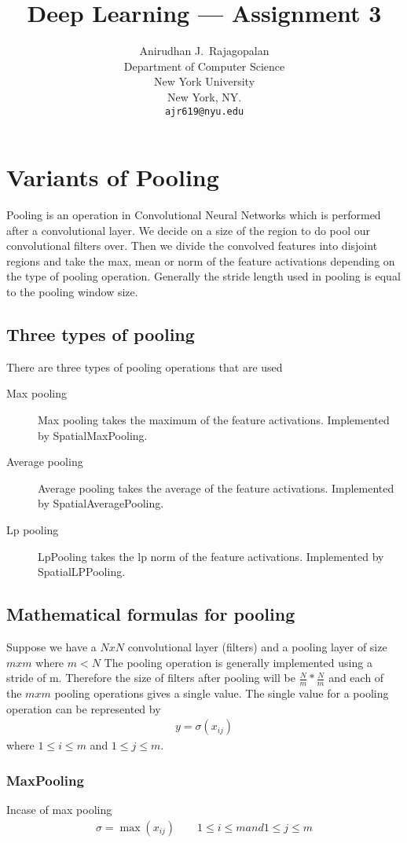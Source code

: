 \documentclass{article}
\title{Deep Learning --- Assignment 3}
\author{Anirudhan J.~Rajagopalan \\
  Department of Computer Science\\
  New York University\\
  New York, NY.\\
  \texttt{ajr619@nyu.edu} \\
}
\begin{document}
\maketitle

\section{Variants of Pooling}
Pooling is an operation in Convolutional Neural Networks which is performed after a convolutional layer.  
We decide on a size of the region to do pool our convolutional filters over.
Then we divide the convolved features into disjoint regions and take the max, mean or norm of the feature activations depending on the type of pooling operation.
Generally the stride length used in pooling is equal to the pooling window size.
\subsection{Three types of pooling}
There are three types of pooling operations that are used
\begin{description}
  \item[Max pooling] Max pooling takes the maximum of the feature activations.  Implemented by \mbox{SpatialMaxPooling}.
  \item[Average pooling] Average pooling takes the average of the feature activations. Implemented by \mbox{SpatialAveragePooling}.
  \item[Lp pooling] LpPooling takes the lp norm of the feature activations. Implemented by \mbox{SpatialLPPooling}.
\end{description}

\subsection{Mathematical formulas for pooling}
Suppose we have a $N x N$ convolutional layer (filters) and a pooling layer of size $m x m$ where $ m < N $
The pooling operation is generally implemented using a stride of m.
Therefore the size of filters after pooling will be $\frac{N}{m} * \frac{N}{m} $ and each of the $m x m$ pooling operations gives a single value.
The single value for a pooling operation can be represented by
\begin{align*}
  y = \sigma(x_{ij})
\end{align*}
where $1 \le i \le m $ and $1 \le j \le m $.
\subsubsection{MaxPooling}
Incase of max pooling
\begin{align*}
  \sigma = \max(x_{ij}) \qquad 1 \le i \le m and 1 \le j \le m
\end{align*}
\end{document}
